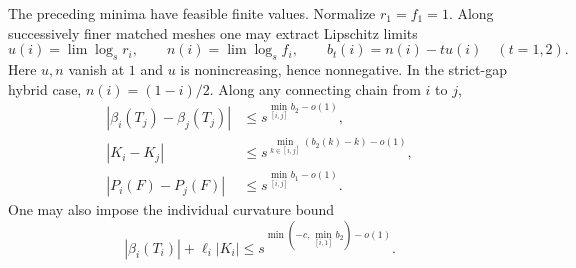 \begin{lemma}\label{cyl:profiles}
The preceding minima have feasible finite values.  Normalize $r_1=f_1=1$.
Along successively finer matched meshes one may extract Lipschitz limits
\begin{equation}\label{cyl:profile-definition}
 u(i)=\lim\log_s r_i,\qquad n(i)=\lim\log_s f_i,\qquad
 b_t(i)=n(i)-tu(i)\quad(t=1,2).
\end{equation}
Here $u,n$ vanish at $1$ and $u$ is nonincreasing, hence nonnegative.
In the strict-gap hybrid case, $n(i)=(1-i)/2$.
Along any connecting chain from $i$ to $j$,
\begin{equation}\tag{A}\label{eq:A}
 \begin{split}
 |\beta_i(T_j)-\beta_j(T_j)|
        &\le s^{\min_{[i,j]}b_2-o(1)},\\
 |K_i-K_j|
        &\le s^{\min_{k\in[i,j]}(b_2(k)-k)-o(1)},\\
 |P_i(F)-P_j(F)|&\le s^{\min_{[i,j]}b_1-o(1)}.
 \end{split}
\end{equation}
One may also impose the individual curvature bound
\begin{equation}\tag{B}\label{eq:B}
 |\beta_i(T_i)|+\ell_i|K_i|
        \le s^{\min(-c,\min_{[i,1]}b_2)-o(1)}.
\end{equation}
\end{lemma}

